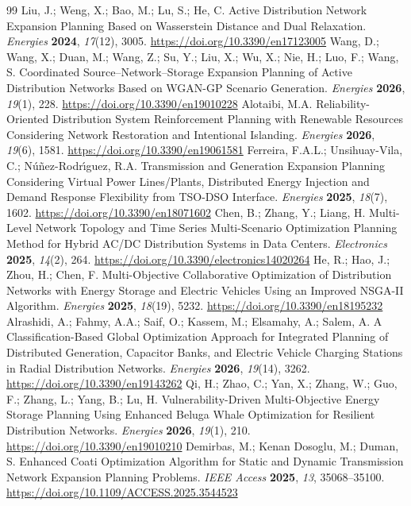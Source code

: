 \documentclass[energies,article,submit,moreauthors]{Definitions/mdpi}
\begin{document}
\begin{thebibliography}{99}
 Liu, J.; Weng, X.; Bao, M.; Lu, S.; He, C. Active Distribution Network Expansion Planning Based on Wasserstein Distance and Dual Relaxation. \emph{Energies} \textbf{2024}, \emph{17}(12), 3005. \url{https://doi.org/10.3390/en17123005}
 Wang, D.; Wang, X.; Duan, M.; Wang, Z.; Su, Y.; Liu, X.; Wu, X.; Nie, H.; Luo, F.; Wang, S. Coordinated Source--Network--Storage Expansion Planning of Active Distribution Networks Based on WGAN-GP Scenario Generation. \emph{Energies} \textbf{2026}, \emph{19}(1), 228. \url{https://doi.org/10.3390/en19010228}
 Alotaibi, M.A. Reliability-Oriented Distribution System Reinforcement Planning with Renewable Resources Considering Network Restoration and Intentional Islanding. \emph{Energies} \textbf{2026}, \emph{19}(6), 1581. \url{https://doi.org/10.3390/en19061581}
 Ferreira, F.A.L.; Unsihuay-Vila, C.; N\'{u}\~{n}ez-Rodr\'{\i}guez, R.A. Transmission and Generation Expansion Planning Considering Virtual Power Lines/Plants, Distributed Energy Injection and Demand Response Flexibility from TSO-DSO Interface. \emph{Energies} \textbf{2025}, \emph{18}(7), 1602. \url{https://doi.org/10.3390/en18071602}
 Chen, B.; Zhang, Y.; Liang, H. Multi-Level Network Topology and Time Series Multi-Scenario Optimization Planning Method for Hybrid AC/DC Distribution Systems in Data Centers. \emph{Electronics} \textbf{2025}, \emph{14}(2), 264. \url{https://doi.org/10.3390/electronics14020264}
 He, R.; Hao, J.; Zhou, H.; Chen, F. Multi-Objective Collaborative Optimization of Distribution Networks with Energy Storage and Electric Vehicles Using an Improved NSGA-II Algorithm. \emph{Energies} \textbf{2025}, \emph{18}(19), 5232. \url{https://doi.org/10.3390/en18195232}
 Alrashidi, A.; Fahmy, A.A.; Saif, O.; Kassem, M.; Elsamahy, A.; Salem, A. A Classification-Based Global Optimization Approach for Integrated Planning of Distributed Generation, Capacitor Banks, and Electric Vehicle Charging Stations in Radial Distribution Networks. \emph{Energies} \textbf{2026}, \emph{19}(14), 3262. \url{https://doi.org/10.3390/en19143262}
 Qi, H.; Zhao, C.; Yan, X.; Zhang, W.; Guo, F.; Zhang, L.; Yang, B.; Lu, H. Vulnerability-Driven Multi-Objective Energy Storage Planning Using Enhanced Beluga Whale Optimization for Resilient Distribution Networks. \emph{Energies} \textbf{2026}, \emph{19}(1), 210. \url{https://doi.org/10.3390/en19010210}
 Demirbas, M.; Kenan Dosoglu, M.; Duman, S. Enhanced Coati Optimization Algorithm for Static and Dynamic Transmission Network Expansion Planning Problems. \emph{IEEE Access} \textbf{2025}, \emph{13}, 35068--35100. \url{https://doi.org/10.1109/ACCESS.2025.3544523}

\end{thebibliography}
\end{document}
